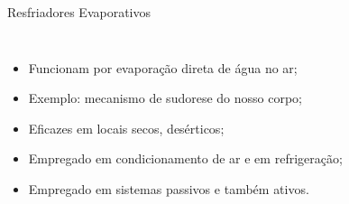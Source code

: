     \begin{frame}{Resfriadores Evaporativos}\vspace*{-0em}
        \begin{columns}
            \begin{itemize}
                \item<1-> Funcionam por \alert{evaporação direta} de \alert{água} no ar;
                    \\[\medskipamount]
                \item<2-> Exemplo: mecanismo de \alert{sudorese} do nosso corpo;
                    \\[\medskipamount]
                \item<3-> Eficazes em locais \alert{secos}, \alert{desérticos};
                    \\[\medskipamount]
                \item<4-> Empregado em \alert{condicionamento de ar} e em \alert{refrigeração};
                    \\[\medskipamount]
                \item<5-> Empregado em sistemas \alert{passivos} e também \alert{ativos}.
            \end{itemize}
        \end{columns}
    \end{frame}
    \begin{frame}\vspace*{-0em}
    \end{frame}
    \begin{frame}\vspace*{-0em}
    \end{frame}
    \begin{frame}\vspace*{-0em}
    \end{frame}
